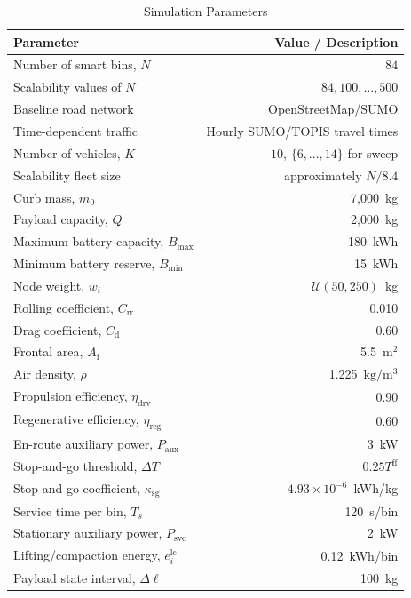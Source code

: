 \begin{table}[t]
    \centering
    \caption{Simulation Parameters}
    \small
    \setlength{\tabcolsep}{2pt}
    \renewcommand{\arraystretch}{1.1}
    \begin{tabular}{lr}
    \toprule
    \textbf{Parameter} & \textbf{Value / Description} \\
    \midrule
    Number of smart bins, $N$ & $84$ \\
    Scalability values of $N$ & $84,100,\ldots,500$ \\
    Baseline road network & OpenStreetMap/SUMO \\
    Time-dependent traffic & Hourly SUMO/TOPIS travel times \\
    Number of vehicles, $K$ & $10$, $\{6,\ldots,14\}$ for sweep \\
    Scalability fleet size & approximately $N/8.4$ \\
    Curb mass, $m_0$ & 7,000~kg \\
    Payload capacity, $Q$ & 2,000~kg \\
    Maximum battery capacity, $B_{\max}$ & 180~kWh \\
    Minimum battery reserve, $B_{\min}$ & 15~kWh \\
    Node weight, $w_i$ & $\mathcal{U}(50,250)$~kg \\
    Rolling coefficient, $C_{\mathrm{rr}}$ & 0.010 \\
    Drag coefficient, $C_{\mathrm{d}}$ & 0.60 \\
    Frontal area, $A_{\mathrm{f}}$ & 5.5~$\mathrm{m}^2$ \\
    Air density, $\rho$ & 1.225~$\mathrm{kg/m^3}$ \\
    Propulsion efficiency, $\eta_{\mathrm{drv}}$ & 0.90 \\
    Regenerative efficiency, $\eta_{\mathrm{reg}}$ & 0.60 \\
    En-route auxiliary power, $P_{\mathrm{aux}}$ & 3~kW \\
    Stop-and-go threshold, $\Delta T$ & $0.25T^{\mathrm{ff}}$ \\
    Stop-and-go coefficient, $\kappa_{\mathrm{sg}}$ &
        $4.93\times10^{-6}$~kWh/kg \\
    Service time per bin, $T_s$ & 120~s/bin \\
    Stationary auxiliary power, $P_{\mathrm{svc}}$ & 2~kW \\
    Lifting/compaction energy, $e_i^{\mathrm{lc}}$ & 0.12~kWh/bin \\
    Payload state interval, $\Delta\ell$ & 100~kg \\
    \bottomrule
    \end{tabular}
    \label{tab:parameters}
\end{table}

